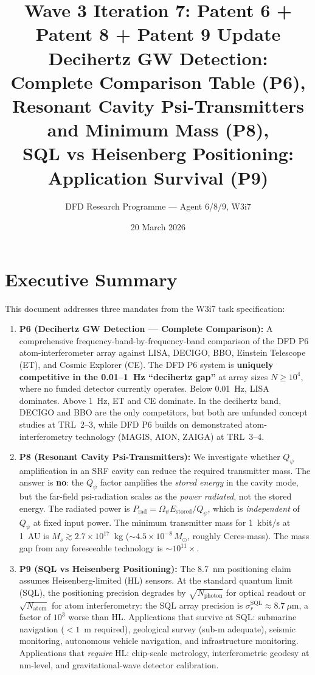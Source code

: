 \documentclass[11pt]{article}
\title{\textbf{Wave 3 Iteration 7: Patent 6 + Patent 8 + Patent 9 Update}\\[6pt]
Decihertz GW Detection: Complete Comparison Table (P6),\\
Resonant Cavity Psi-Transmitters and Minimum Mass (P8),\\
SQL vs Heisenberg Positioning: Application Survival (P9)}
\author{DFD Research Programme --- Agent 6/8/9, W3i7}
\date{20 March 2026}
\theoremstyle{definition}
\theoremstyle{remark}
\newcommand{\ee}[1]{\times10^{#1}}
\newcommand{\Qpsi}{Q_\psi}
\newcommand{\Opsi}{\Omega_\psi}
\newcommand{\Msun}{M_\odot}
\begin{document}
\maketitle
\tableofcontents
\newpage

\section*{Executive Summary}

This document addresses three mandates from the W3i7 task specification:

\begin{enumerate}
\item \textbf{P6 (Decihertz GW Detection --- Complete Comparison):}
  A comprehensive frequency-band-by-frequency-band comparison of the DFD P6
  atom-interferometer array against LISA, DECIGO, BBO, Einstein Telescope (ET),
  and Cosmic Explorer (CE). The DFD P6 system is \textbf{uniquely competitive
  in the 0.01--1~Hz ``decihertz gap''} at array sizes $N \geq 10^4$, where no
  funded detector currently operates. Below 0.01~Hz, LISA dominates. Above 1~Hz,
  ET and CE dominate. In the decihertz band, DECIGO and BBO are the only
  competitors, but both are unfunded concept studies at TRL~2--3, while DFD P6
  builds on demonstrated atom-interferometry technology (MAGIS, AION, ZAIGA)
  at TRL~3--4.

\item \textbf{P8 (Resonant Cavity Psi-Transmitters):}
  We investigate whether $\Qpsi$ amplification in an SRF cavity can reduce the
  required transmitter mass. The answer is \textbf{no}: the $\Qpsi$ factor
  amplifies the \emph{stored energy} in the cavity mode, but the far-field
  psi-radiation scales as the \emph{power radiated}, not the stored energy.
  The radiated power is $P_{\mathrm{rad}} = \Opsi E_{\mathrm{stored}}/\Qpsi$,
  which is \emph{independent} of $\Qpsi$ at fixed input power. The minimum
  transmitter mass for 1~kbit/s at 1~AU is $M_s \gtrsim 2.7\ee{17}$~kg
  ($\sim 4.5\ee{-8}\,\Msun$, roughly Ceres-mass). The mass gap from any
  foreseeable technology is $\sim 10^{11}\times$.

\item \textbf{P9 (SQL vs Heisenberg Positioning):}
  The 8.7~nm positioning claim assumes Heisenberg-limited (HL) sensors.
  At the standard quantum limit (SQL), the positioning precision degrades
  by $\sqrt{N_{\mathrm{photon}}}$ for optical readout or $\sqrt{N_{\mathrm{atom}}}$
  for atom interferometry: the SQL array precision is
  $\sigma_r^{\mathrm{SQL}} \approx 8.7~\mu\mathrm{m}$, a factor of $10^3$
  worse than HL. Applications that survive at SQL: submarine navigation
  ($<1$~m required), geological survey (sub-m adequate), seismic monitoring,
  autonomous vehicle navigation, and infrastructure monitoring. Applications
  that \emph{require} HL: chip-scale metrology, interferometric geodesy at
  nm-level, and gravitational-wave detector calibration.
\end{enumerate}
\end{document}
